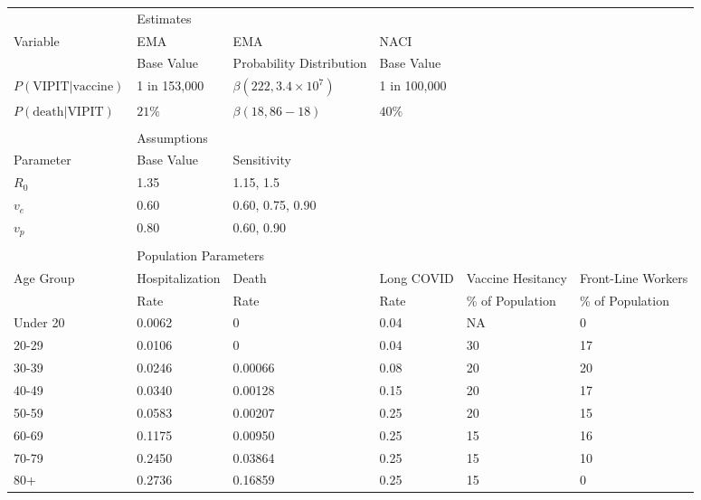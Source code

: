 \documentclass[]{interact}
\theoremstyle{plain}%
\theoremstyle{definition}
\theoremstyle{remark}
\begin{document}
\begin{table}
{\begin{tabular}{llllll} \toprule
 & \multicolumn{2}{l}{Estimates} \\ \cmidrule{2-6}
 Variable & EMA & EMA  & NACI  \\
  & Base Value & Probability Distribution & Base Value \\ \midrule
 $P(\text{VIPIT}|\text{vaccine})$ & 1 in 153,000 & $\beta(222, 3.4\times 10^7)$ & 1 in 100,000 \\
 $P(\text{death}|\text{VIPIT})$ & $21\%$ &  $\beta(18, 86-18)$ & $40\%$ \\ \\
 & \multicolumn{2}{l}{Assumptions} \\ \cmidrule{2-6}
 Parameter  & Base Value & Sensitivity & \\ \midrule
 $R_0$ & 1.35 & 1.15, 1.5 &  \\ 
 $v_e$ & 0.60 & 0.60, 0.75, 0.90 &  \\ 
 $v_p$ & 0.80 & 0.60, 0.90 &  \\ \\
 
  & \multicolumn{2}{l}{Population Parameters} \\ \cmidrule{2-6}
  Age  Group & Hospitalization & Death   & Long COVID & Vaccine Hesitancy & Front-Line Workers \\ 
             & Rate            & Rate    & Rate       & \% of Population & \% of Population \\ 

  \midrule
Under 20   & 0.0062    & 0       & 0.04       & NA                & 0           \\ 
20-29      & 0.0106    & 0       & 0.04       & 30               & 17          \\ 
30-39      & 0.0246    & 0.00066 & 0.08       & 20               & 20          \\ 
40-49      & 0.0340    & 0.00128 & 0.15       & 20               & 17          \\ 
50-59      & 0.0583    & 0.00207 & 0.25       & 20               & 15          \\ 
60-69      & 0.1175    & 0.00950 & 0.25       & 15              & 16          \\ 
70-79      & 0.2450    & 0.03864 & 0.25       & 15              & 10          \\ 
80+        & 0.2736    & 0.16859 & 0.25       & 15              & 0           \\
 

\end{tabular}}
\end{table}
\end{document}
